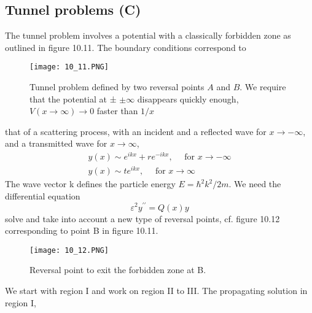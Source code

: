 \subsection{Tunnel problems (C)}
The tunnel problem involves a potential with a classically forbidden zone as outlined in figure 10.11. The boundary conditions correspond to
\begin{figure}[ht]
    \begin{minipage}{0.5\textwidth}
        \centering
        \texttt{[image: 10\_11.PNG]}
    \end{minipage}
    \begin{minipage}{0.5\textwidth}
        \caption{Tunnel problem defined by two reversal points $A$ and $B$. We require that the potential at ± $\pm\infty$ disappears quickly enough, $V(x\rightarrow\infty)\rightarrow 0$ faster than $1 / x$}
    \end{minipage}
\end{figure}
that of a scattering process, with an incident and a reflected wave for $x\rightarrow-\infty$, and a transmitted wave for $x\rightarrow\infty$,
\begin{equation}
\begin{array}{l}{y(x) \sim e^{i k x}+r e^{-i k x}, \quad \text { for } x \rightarrow-\infty} \\ {y(x) \sim t e^{i k x}, \quad \text { for } x \rightarrow \infty}\end{array}
\end{equation}
The wave vector k defines the particle energy $E = \hbar^2k^2 / 2m$. We need the differential equation
%
\begin{equation}
    \varepsilon^{2} y^{\prime \prime}=Q(x) y
    \end{equation}
solve and take into account a new type of reversal points, cf. figure 10.12 corresponding to point B in figure 10.11.
\begin{figure}[ht]
    \begin{minipage}{0.5\textwidth}
        \centering
        \texttt{[image: 10\_12.PNG]}
    \end{minipage}
    \begin{minipage}{0.5\textwidth}
        \caption{Reversal point to exit the forbidden zone at B.}
    \end{minipage}
\end{figure}
We start with region I and work on region II to III. The propagating solution in region I,
